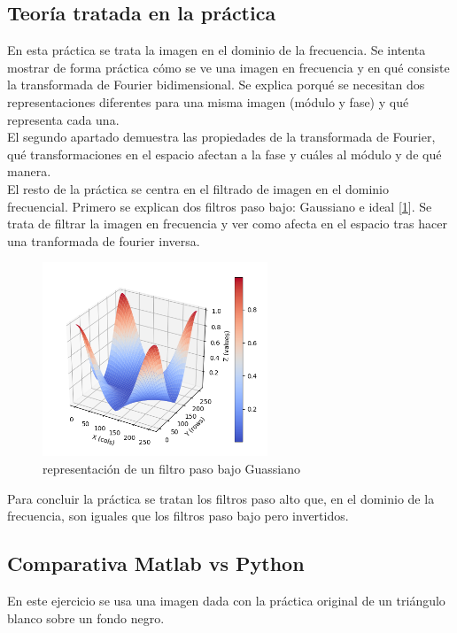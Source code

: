 \documentclass[a4paper,12pt]{report}
\begin{document}
\subsection{Teoría tratada en la práctica}

En esta práctica se trata la imagen en el dominio de la frecuencia. Se intenta mostrar de forma práctica cómo se ve una imagen en frecuencia y en qué consiste la transformada de Fourier bidimensional. Se explica porqué se necesitan dos representaciones diferentes para una misma imagen (módulo y fase) y qué representa cada una.\\

El segundo apartado demuestra las propiedades de la transformada de Fourier, qué transformaciones en el espacio afectan a la fase y cuáles al módulo y de qué manera.\\

El resto de la práctica se centra en el filtrado de imagen en el dominio frecuencial. Primero se explican dos filtros paso bajo: Gaussiano e ideal [\ref {gauss}]. Se trata de filtrar la imagen en frecuencia y ver como afecta en el espacio tras hacer una tranformada de fourier inversa.
\begin{figure}[h]
\centering
\includegraphics[width=0.6\textwidth]{imagenes/gaussfpb}
\caption{representación de un filtro paso bajo Guassiano}
\label{gauss}
\end{figure}
 Para concluir la práctica se tratan los filtros paso alto que, en el dominio de la frecuencia, son iguales que los filtros paso bajo pero invertidos.
\subsection{Comparativa Matlab vs Python}

En este ejercicio se usa una imagen dada con la práctica original de un triángulo blanco sobre un fondo negro.\\
\end{document}
